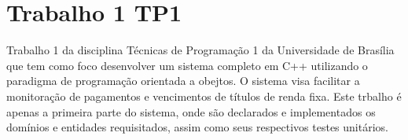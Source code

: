 \chapter{Trabalho 1 TP1}
\hypertarget{md__r_e_a_d_m_e}{}\label{md__r_e_a_d_m_e}
\label{md__r_e_a_d_m_e_autotoc_md0}%
%
Trabalho 1 da disciplina Técnicas de Programação 1 da Universidade de Brasília que tem como foco desenvolver um sistema completo em C++ utilizando o paradigma de programação orientada a obejtos. O sistema visa facilitar a monitoração de pagamentos e vencimentos de títulos de renda fixa. Este trbalho é apenas a primeira parte do sistema, onde são declarados e implementados os domínios e entidades requisitados, assim como seus respectivos testes unitários. 